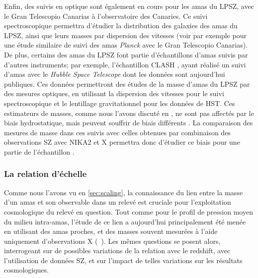 Enfin, des suivis en optique sont également en cours pour les amas du LPSZ, avec le Gran Telescopio Canarias à l'observatoire des Canaries.
Ce suivi spectroscopique permettra d'étudier la distribution des galaxies des amas du LPSZ, ainsi que leurs masses par dispersion des vitesses (voir par exemple \cite{barrena_optical_2020} pour une étude similaire de suivi des amas \textit{Planck} avec le Gran Telescopio Canarias).
De plus, certains des amas du LPSZ font partie d'échantillons d'amas suivis par d'autres instruments; par exemple, l'échantillon CLASH \cite{postman_cluster_2012}, ayant réalisé un suivi d'amas avec le \textit{Hubble Space Telescope} dont les données sont aujourd'hui publiques.
Ces données permettront des études de la masse d'amas du LPSZ par des mesures optiques, en utilisant la dispersion des vitesses pour le suivi spectroscopique et le lentillage gravitationnel pour les données de HST.
Ces estimateurs de masses, comme nous l'avons discuté en , ne sont pas affectés par le biais hydrostatique, mais peuvent souffrir de biais différents \cite{becker_accuracy_2011, grandis_calibration_2021}.
La comparaison des mesures de masse dans ces suivis avec celles obtenues par combinaison des observations SZ avec NIKA2 et X permettra donc d'étudier ce biais pour une partie de l'échantillon \cite{munoz_echevarria_lpsz-clash_2021}.

\subsubsection{La relation d'échelle} %
Comme nous l'avons vu en \ref{sec:scaling}, la connaissance du lien entre la masse d'un amas et son observable dans un relevé est cruciale pour l'exploitation cosmologique du relevé en question.
Tout comme pour le profil de pression moyen du milieu intra-amas, l'étude de ce lien a aujourd'hui principalement été menée en utilisant des amas proches, et des masses souvent mesurées à l'aide uniquement d'observations X (\eg\ \cite{arnaud_universal_2010,planck_collaboration_planck_2011}).
Les mêmes questions se posent alors, interrogeant sur de possibles variations de la relation avec le redshift, avec l'utilisation de données SZ, et sur l'impact de telles variations sur les résultats cosmologiques.

